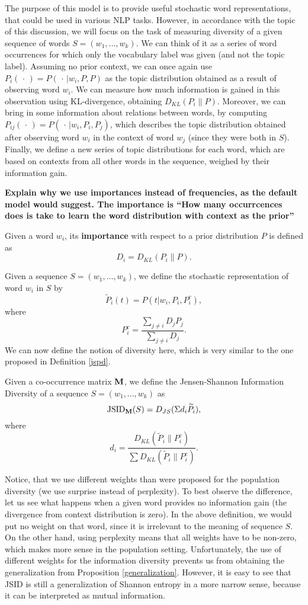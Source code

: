 \documentclass{article}
\begin{document}
The purpose of this model is to provide useful stochastic
word representations, that could be used in various NLP
tasks. However, in accordance with the topic of this discussion, we will
focus on the task of measuring diversity of a given sequence of words
$S=(w_1,...,w_k)$. We can think of it as a series of word occurrences for
which only the vocabulary label was given (and not the topic
label). Assuming no prior context, we can once again use
$P_i(\,\cdot\,)=P(\,\cdot\,|w_i,P,P)$  as the topic distribution
obtained as a result 
of observing word $w_i$. We can measure how much information is gained
in this observation using KL-divergence, obtaining
$D_{KL}(P_i\|P)$. Moreover, we can bring in some information about
relations between words, by computing $P_{ij}(\,\cdot\,) =
P(\,\cdot\,|w_i,P_i,P_j)$, 
which describes the topic distribution obtained after observing word
$w_i$ in the context of word $w_j$ (since they were both in
$S$). Finally, we define a new series of topic
distributions for each word, which are based on contexts from all other
words in the sequence, weighed by their information gain.

{\bf Explain why we use importances instead of frequencies, as the
  default model would suggest. The importance is ``How many
  occurrcences does is take to learn the word distribution with
  context as the prior''} 

\bed
Given a word $w_i$, its {\bf importance} with respect to a
prior distribution $P$ is defined as 
\[D_i = D_{KL}(P_i\|P).\]
\eed

\bed
Given a sequence $S=(w_1,...,w_k)$, we define the stochastic
representation of word $w_i$ in $S$ by 
\[\widetilde{P}_i(t) = P(t|w_i,P_i,P_i^c),\]
where
\[P_i^c = \frac{\sum_{j\neq i} D_jP_j}{\sum_{j\neq i}D_j}.\]
\eed
We can now define the notion of diversity here, which is very similar
to the one proposed in Definition \ref{jspd}.

\bed
Given a co-occurrence matrix $\operatorname{\mathbf{M}}$, we define the Jensen-Shannon
Information Diversity of a sequence 
$S=(w_1,...,w_k)$ as
\[\mbox{JSID}_{\operatorname{\mathbf{M}}}(S)=D_{JS}(\Sigma d_i \widetilde{P}_i),\]
where 
\[d_{i}=\frac{D_{KL}(\widetilde{P}_i\|P_i^c)}{\sum D_{KL}(\widetilde{P}_i\|P_i^c)}.\]
\eed

Notice, that we use different weights than were proposed for the
population diversity (we use surprise instead of perplexity). To
best observe the difference, let us see what happens when a given word
provides no information gain (the divergence from context distribution
is zero). In the above definition, we would put no weight on that
word, since it is irrelevant to the meaning of sequence $S$. On the
other hand, using perplexity means that all weights have to be
non-zero, which makes more sense in the population
setting. Unfortunately, the
use of different weights for the information diversity prevents us
from obtaining the generalization from Proposition
\ref{generalization}. However, it is easy to see that JSID is still a
generalization of Shannon entropy in a more narrow sense, because it
can be interpreted as mutual information. 
\end{document}
